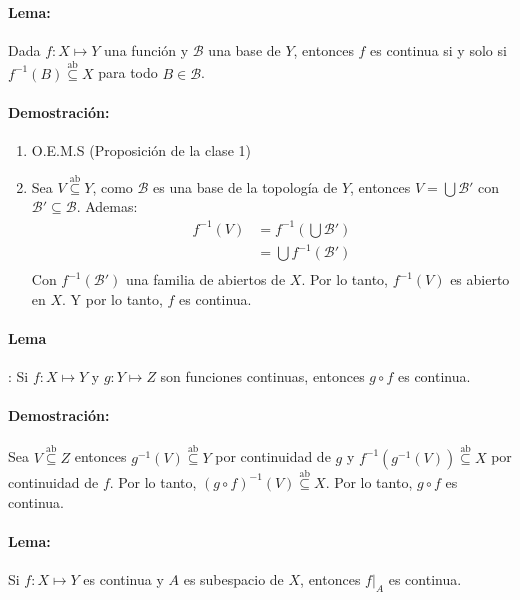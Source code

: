 \paragraph{Lema:} Dada $f:X \mapsto Y$ una función  y $\mathcal B$ una base de $Y$, entonces  $f$ es continua si y solo si $f^{-1}(B) \overset{\text{ab}}{\subseteq} X$ para todo $B \in \mathcal B$.

\paragraph{Demostración:}
\begin{enumerate}
    \item[$\Rightarrow$] O.E.M.S (Proposición de la clase 1)
    \item[$\Leftarrow$] Sea $V \overset{\text{ab}}{\subseteq} Y$, como $\mathcal{B}$ es una base de la topología de $Y$, entonces $V = \bigcup \mathcal B'$ con $\mathcal B' \subseteq \mathcal B$. Ademas:
    \begin{align*}
        f^{-1}(V) &= f^{-1}(\bigcup \mathcal B') \\
        &= \bigcup f^{-1}( \mathcal B') \\
    \end{align*}
    Con $f^{-1}(\mathcal B')$ una familia de abiertos de $X$. Por lo tanto, $f^{-1}(V)$ es abierto en $X$. Y por lo tanto, $f$ es continua.
\end{enumerate}

\paragraph{Lema}: Si $f:X \mapsto Y$  y $g:Y \mapsto Z$ son funciones continuas, entonces $g \circ f$ es continua.

\paragraph{Demostración:} Sea $V \overset{\text{ab}}{\subseteq} Z$ entonces $g^{-1}(V) \overset{\text{ab}}{\subseteq} Y$ por continuidad de $g$ y $f^{-1}(g^{-1}(V)) \overset{\text{ab}}{\subseteq} X$ por continuidad de $f$. Por lo tanto, $(g \circ f)^{-1}(V) \overset{\text{ab}}{\subseteq} X$. Por lo tanto, $g \circ f$ es continua.

\paragraph{Lema:} Si $f:X \mapsto Y$ es continua y $A$ es subespacio de $X$, entonces $f|_A$ es continua.

